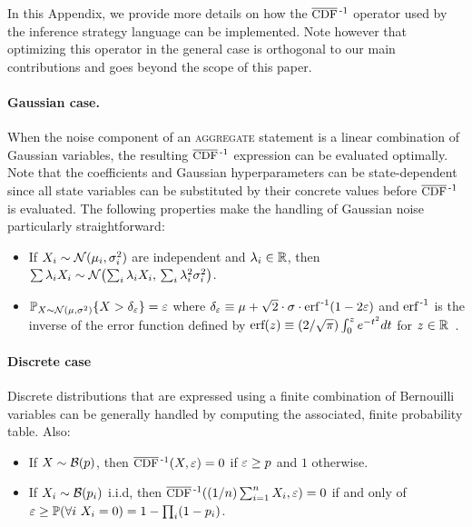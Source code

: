 \documentclass[acmsmall,screen,nonacm]{acmart}
\begin{document}
In this Appendix, we provide more details on how the $\InvCCDF$ operator used by the inference strategy language can be implemented. Note however that optimizing this operator in the general case is orthogonal to our main contributions and goes beyond the scope of this paper.

\paragraph{Gaussian case.} When the noise component of an \textsc{aggregate} statement is a linear combination of Gaussian variables, the resulting $\InvCCDF$ expression can be evaluated optimally. Note that the coefficients and Gaussian hyperparameters can be state-dependent since all state variables can be substituted by their concrete values before $\InvCCDF$ is evaluated. The following properties make the handling of Gaussian noise particularly straightforward:
\begin{itemize}
  \item If $X_i \sim \mathcal{N}(\mu_i, \sigma_i^2)$ are independent and $\lambda_i \in \mathbb{R}$, then $\sum \lambda_i X_i \sim \mathcal{N}\bigl(\sum_i \lambda_i X_i, \, \sum_i \lambda_i^2 \sigma_i^2\bigr)$.
  \item $\mathbb{P}_{X \sim \mathcal{N}(\mu, \sigma^2)} \{ X > \delta_\varepsilon \} = \varepsilon$ where $\delta_\varepsilon \equiv \mu + \sqrt{2} \cdot \sigma \cdot \operatorname{\text{erf}^{\,-1}}(1 - 2\varepsilon)$ and $\operatorname{\text{erf}^{\,-1}}$ is the inverse of the error function defined by $\operatorname{\text{erf}}(z) \equiv (2/\sqrt{\pi}) \int_0^z e^{-t^2}dt$ for $z \in \mathbb{R}$~\cite{bertsekas2008introduction}.
\end{itemize}

\paragraph{Discrete case} Discrete distributions that are expressed using a finite combination of Bernouilli variables can be generally handled by computing the associated, finite probability table. Also:
\begin{itemize}
  \item If $X \sim \mathcal{B}(p)$, then $\InvCCDF(X, \Eps) = 0$ if $\varepsilon \ge p$ and $1$ otherwise.
  \item If $X_i \sim \mathcal{B}(p_i)$ i.i.d, then $\InvCCDF((1/n)\sum_{i=1}^n X_i, \Eps) = 0$ if and only of $\varepsilon \ge \mathbb{P}(\forall i \ X_i = 0) = 1 - \prod_i(1-p_i)$.
\end{itemize}
\end{document}
